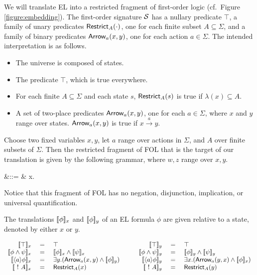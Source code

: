 

\NI We will translate EL into a restricted fragment of first-order
logic (cf.~Figure \ref{figure:embedding}). The first-order signature
$\mathcal{S}$ has a nullary predicate $\top$, a family of unary predicates
$\mathsf{Restrict}_{A}(\cdot)$, one for each finite subset $A \subseteq
\Sigma$, and a family of binary predicates $\mathsf{Arrow}_{a}(x, y)$, one for
each action $a \in \Sigma$.  The intended interpretation is as
follows.

\begin{itemize}

\item The universe is composed of states.

\item The predicate $\top$, which is true everywhere.

\item For each finite $A \subseteq \Sigma$ and each state $s$,  $\mathsf{Restrict}_{A}(s)$
is true if 
  $\lambda(x) \subseteq A$.

\item A set of two-place predicates $\mathsf{Arrow}_{a}(x, y)$, one for each $a
  \in \Sigma$, where $x$ and $y$ range over states. $\mathsf{Arrow}_{a}(x, y)$
  is true if $x \xrightarrow{a} y$.


\end{itemize}

\NI Choose two fixed variables $x, y$, let $a$ range over actions in
$\Sigma$, and $A$ over finite subsets of $\Sigma$. Then the restricted
fragment of FOL that is the target of our translation is given by the
following grammar, where $w, z$ range over $x, y$.

\begin{GRAMMAR}
  \phi 
     &\quad ::= \quad&
  \top \fOr {}\fOr {} \fOr \phi \AND \psi \fOr \exists x. \phi 
\end{GRAMMAR}

\NI Notice that this fragment of FOL has no negation, disjunction,
implication, or universal quantification. 

The translations $\lbrack\!\lbrack \phi \rbrack\!\rbrack_x$ and $\lbrack\!\lbrack \phi \rbrack\!\rbrack_y$ of an EL formula
$\phi$ are given relative to a state, denoted by either $x$ or $y$.

\[
\begin{array}{rclcrcl}
  \SEMB{\top}_x & \ = \ & \top  
     &\quad& 
  \SEMB{\top}_y & \ = \ & \top 
     \\
  \SEMB{\phi \AND \psi}_x & = & \SEMB{\phi}_x \AND \SEMB{\psi}_x  
     && 
  \SEMB{\phi \AND \psi}_y & = & \SEMB{\phi}_y \AND \SEMB{\psi}_y  
     \\
  \SEMB{\langle a \rangle \phi}_x & = & \exists y.(\ARROW{a}{x}{y} \AND \SEMB{\phi}_y)  
     &&
  \SEMB{\langle a \rangle \phi}_y & = & \exists x.(\ARROW{a}{y}{x} \AND \SEMB{\phi}_x)  
     \\
  \SEMB{\fBang A}_x & = & \RESTRICT{A}{x}
     &&
  \SEMB{\fBang A}_y & = & \RESTRICT{A}{y}
\end{array}
\]

